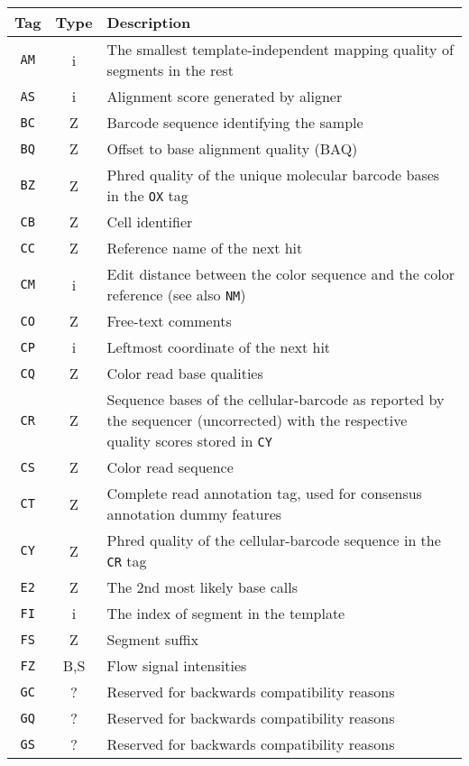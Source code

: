 \documentclass[10pt]{article}
\begin{document}
\begin{center}\small
\begin{longtable}{ccp{12.5cm}}
\hline
  {\bf Tag} & {\bf Type} & {\bf Description} \\
  \hline
  {\tt AM} & i & The smallest template-independent mapping quality of segments in the rest \\
  {\tt AS} & i & Alignment score generated by aligner \\
  {\tt BC} & Z & Barcode sequence identifying the sample \\
  {\tt BQ} & Z & Offset to base alignment quality (BAQ) \\
  {\tt BZ} & Z & Phred quality of the unique molecular barcode bases in the {\tt OX} tag \\
  {\tt CB} & Z & Cell identifier \\
  {\tt CC} & Z & Reference name of the next hit \\
  {\tt CM} & i & Edit distance between the color sequence and the color reference (see also {\tt NM}) \\
  {\tt CO} & Z & Free-text comments \\
  {\tt CP} & i & Leftmost coordinate of the next hit \\
  {\tt CQ} & Z & Color read base qualities \\
  {\tt CR} & Z & Sequence bases of the cellular-barcode as reported by the sequencer (uncorrected) with the respective quality scores stored in {\tt CY}\\
  {\tt CS} & Z & Color read sequence \\
  {\tt CT} & Z & Complete read annotation tag, used for consensus annotation dummy features \\
  {\tt CY} & Z & Phred quality of the cellular-barcode sequence in the {\tt CR} tag \\
  {\tt E2} & Z & The 2nd most likely base calls \\
  {\tt FI} & i & The index of segment in the template \\
  {\tt FS} & Z & Segment suffix \\
  {\tt FZ} & B,S & Flow signal intensities \\
  {\tt GC} & ? & Reserved for backwards compatibility reasons \\
  {\tt GQ} & ? & Reserved for backwards compatibility reasons \\
  {\tt GS} & ? & Reserved for backwards compatibility reasons \\

\end{longtable}
\end{center}
\end{document}
